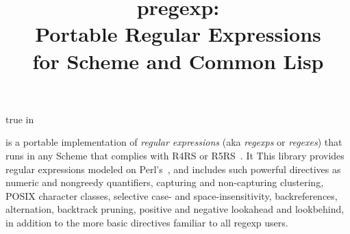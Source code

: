 \ifx\MzLibManual\Undefined



 true in

\ifx\shipout\UNDEFINED

\let\PRIMsection\section
\def\section{\htmlpagebreak\PRIMsection}
\fi

\let\CITE\cite
\let\SECTION\section

\def\Index#1{}

\def\meta[#1]{{\em #1}}

\let\rawscm\scm

\title{pregexp: \\ 
Portable Regular Expressions \\ 
for Scheme and Common Lisp}

\centerline{}

\bigskip
\else




\newcommand{\CITE}[2][]{}
\let\Index\index
\let\f\footnote


\fi

\ifx\MzLibManual\Undefined
\n {} is a portable implementation of {\em
regular expressions} (aka {\em regexps} or {\em
regexes}) that runs in any Scheme
that complies with R4RS or R5RS~\cite{r5rs}.  It
\else
This library 
\fi
provides regular expressions
modeled on
Perl's~\CITE{friedl:regex,pperl}, and includes such
powerful directives as numeric and nongreedy
quantifiers, capturing and non-capturing clustering,
POSIX character classes, selective case- and
space-insensitivity, backreferences, alternation,
backtrack pruning,
positive and negative lookahead and lookbehind, in
addition to the more basic directives familiar to all
regexp users.

